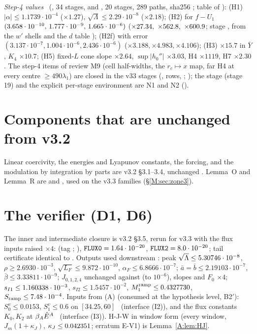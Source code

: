 \documentclass[11pt]{article}
\begin{document}
\noindent\emph{Step-4 values} \tC\ (, 34 stages, and , 20 stages, 289 paths, sha256 ; table of ): (H1) $|\alpha|\le1.1739\cdot10^{-4}$ ($\times1.27$), $\sqrt\Lambda\le2.29\cdot10^{-8}$ ($\times2.18$); (H2) for $f-U_1$ $(3.658\cdot10^{-10},\,1.777\cdot10^{-9},\,1.665\cdot10^{-6})$ ($\times27.34,\ \times562.8,\ \times600.9$; stage , from the $w'$ shells and the $d$ table ); (H2f) with error $(3.137\cdot10^{-7},1.004\cdot10^{-6},2.436\cdot10^{-6})$ ($\times3.188,\times4.983,\times4.106$); (H3) $\times15.7$ in $\bar Y$, $K_4$ $\times10.7$; (H5) fixed-$L$ cone slope $\times2.64$, $\sup|h_0''|$ $\times3.03$, H4 $\times1119$, H7 $\times2.30$. The step-4 items of review M9 (cell half-widths, the $r_c\mapsto x$ map, far H4 at every centre $\ge490\lambda_1$) are closed in the v33 stages (,  rows, ; ); the stage  (stage 19) and the explicit per-stage environment are N1 and N2 ().

\section{Components that are unchanged from v3.2}\label{M:sec:unchanged}
Linear coercivity, the energies and Lyapunov constants, the forcing, and the modulation by integration by parts are v3.2 \S3.1--3.4, unchanged \tC. Lemma~O and Lemma~R are  and , used on the v3.3 families (\S\ref{M:sec:zone3}).

\section{The verifier (D1, D6)}\label{M:sec:verifier}
The inner and intermediate closure is v3.2 \S3.5, rerun for v3.3 with the flux inputs raised $\times4$:  (tag ; ), $\fn{FLUX0}=1.64\cdot10^{-20}$, $\fn{FLUX2}=8.0\cdot10^{-20}$; tail certificate identical to . Outputs used downstream \tC: peak $\sqrt\Lambda\le5.30746\cdot10^{-8}$, $\rho\ge2.6930\cdot10^{-3}$, $\sqrt{L_F}\le9.872\cdot10^{-10}$, $\alpha_F\le6.8666\cdot10^{-7}$; $\bar a=\bar b\le2.19103\cdot10^{-7}$, $\bar\beta\le3.33811\cdot10^{-9}$; $J_{0,1,2,4}$ unchanged against  (to $10^{-6}$), slopes and $F_0$ $\times4$; $s_{I1}\le1.160338\cdot10^{-3}$, $s_{I2}\le1.5457\cdot10^{-2}$, $M_1^{\rm ramp}\le0.4327730$, $S_{\rm ramp}\le7.48\cdot10^{-4}$. Inputs from (A) (consumed at the hypothesis level, B2$'$): $S^v_0\le0.0153$, $S^v_1\le0.6$ on $[34.25,60]$ \tB\ (interface (I2)), and the flux constants $K_0,K_2$ at $\beta_A\hat E^A$ \tB\ (interface (I3)). H-J-W in window form (every window, $J_m(1+\kappa_J)$, $\kappa_J\le0.042351$; erratum E-V1) is Lemma~\ref{A:lem:HJ}.
\end{document}
